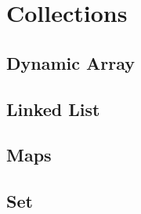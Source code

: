 \chapter{Collections}

\section{Dynamic Array}
\csharpsubsection{\csharp}

\section{Linked List}
\csharpsubsection{\csharp}

\section{Maps}
\csharpsubsection{\csharp}

\section{Set}
\csharpsubsection{\csharp}

